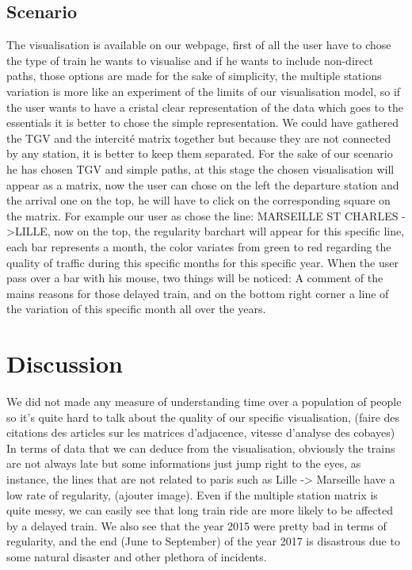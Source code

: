 \documentclass{vgtc}
\begin{document}
\subsection{Scenario}
\indent
The visualisation is available on our webpage, first of all the user have to chose the type of train he wants to visualise and if he wants to include non-direct paths, those options are made for the sake of simplicity, the multiple stations variation  is more like an experiment of the limits of our visualisation model, so if the user wants to have a cristal clear representation of the data which goes to the essentials it is better to chose the simple representation. We could have gathered the TGV and the intercit\'e matrix together but because they are not connected by any station, it is better to keep them separated. For the sake of our scenario he has chosen TGV and simple paths, at this stage the chosen visualisation will appear as a matrix, now the user can chose on the left the departure station and the arrival one on the top, he will have to click on the corresponding square on the matrix. For example our user as chose the line: MARSEILLE ST CHARLES -\textgreater LILLE, now on the top, the regularity barchart will appear for this specific line, each bar represents a month, the color variates from green to red regarding the quality of traffic during this specific months for this specific year. When the user pass over a bar with his mouse, two things will be noticed: A comment of the mains reasons for those delayed train, and on the bottom right corner a line of the variation of this specific month all over the years.

\section{Discussion}
\indent
We did not made any measure of understanding time over a population of people so it's quite hard to talk about the quality of our specific visualisation, (faire des citations des articles sur les matrices d'adjacence, vitesse d'analyse des cobayes) 
In terms of data that we can deduce from the visualisation, obviously the trains are not always late but some informations just jump right to the eyes, as instance, the lines that are not related to paris such as Lille -> Marseille have a low rate of regularity, (ajouter image). Even if the multiple station matrix is quite messy, we can easily see that long train ride are more likely to be affected by a delayed train. 
We also see that the year 2015 were pretty bad in terms of regularity, and the end (June to September) of the year 2017 is disastrous due to some natural disaster and other plethora of incidents.
\end{document}
